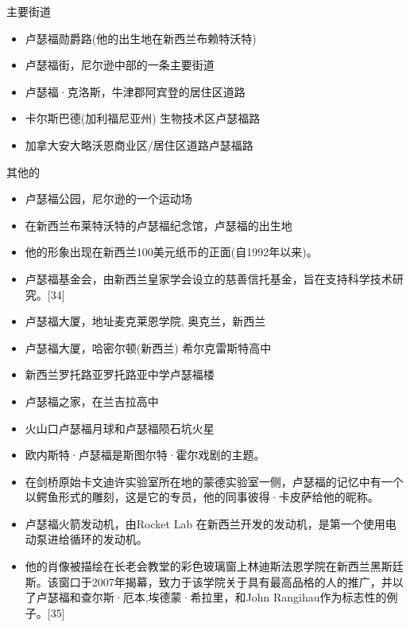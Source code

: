 主要街道
\begin{itemize}
\item 卢瑟福勋爵路(他的出生地在新西兰布赖特沃特)
\item 卢瑟福街，尼尔逊中部的一条主要街道
\item 卢瑟福·克洛斯，牛津郡阿宾登的居住区道路
\item 卡尔斯巴德(加利福尼亚州) 生物技术区卢瑟福路
\item 加拿大安大略沃恩商业区/居住区道路卢瑟福路
\end{itemize}
其他的
\begin{itemize}
\item 卢瑟福公园，尼尔逊的一个运动场
\item 在新西兰布莱特沃特的卢瑟福纪念馆，卢瑟福的出生地
\item 他的形象出现在新西兰100美元纸币的正面(自1992年以来)。
\item 卢瑟福基金会，由新西兰皇家学会设立的慈善信托基金，旨在支持科学技术研究。[34]
\item 卢瑟福大厦，地址麦克莱恩学院, 奥克兰，新西兰
\item 卢瑟福大厦，哈密尔顿(新西兰) 希尔克雷斯特高中
\item 新西兰罗托路亚罗托路亚中学卢瑟福楼
\item 卢瑟福之家，在兰吉拉高中
\item 火山口卢瑟福月球和卢瑟福陨石坑火星
\item 欧内斯特·卢瑟福是斯图尔特·霍尔戏剧的主题。
\item 在剑桥原始卡文迪许实验室所在地的蒙德实验室一侧，卢瑟福的记忆中有一个以鳄鱼形式的雕刻，这是它的专员，他的同事彼得·卡皮萨给他的昵称。
\item 卢瑟福火箭发动机，由Rocket Lab 在新西兰开发的发动机，是第一个使用电动泵进给循环的发动机。
\item 他的肖像被描绘在长老会教堂的彩色玻璃窗上林迪斯法恩学院在新西兰黑斯廷斯。该窗口于2007年揭幕，致力于该学院关于具有最高品格的人的推广，并以了卢瑟福和查尔斯·厄本,埃德蒙·希拉里，和John Rangihau作为标志性的例子。[35]
\end{itemize}
